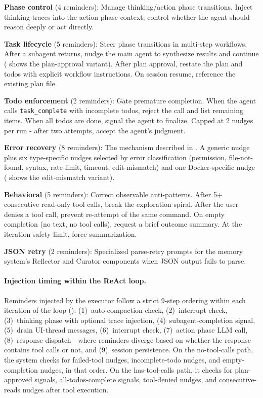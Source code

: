 \begin{packeditemize}
\item \textbf{Phase control} (4 reminders): Manage thinking/action phase transitions. Inject thinking traces into the action phase context; control whether the agent should reason deeply or act directly.

\item \textbf{Task lifecycle} (5 reminders): Steer phase transitions in multi-step workflows. After a subagent returns, nudge the main agent to synthesize results and continue ( shows the plan-approval variant). After plan approval, restate the plan and todos with explicit workflow instructions. On session resume, reference the existing plan file.

\item \textbf{Todo enforcement} (2 reminders): Gate premature completion. When the agent calls \texttt{task\_complete} with incomplete todos, reject the call and list remaining items. When all todos are done, signal the agent to finalize. Capped at 2 nudges per run - after two attempts, accept the agent's judgment.

\item \textbf{Error recovery} (8 reminders): The mechanism described in . A generic nudge plus six type-specific nudges selected by error classification (permission, file-not-found, syntax, rate-limit, timeout, edit-mismatch) and one Docker-specific nudge ( shows the edit-mismatch variant).

\item \textbf{Behavioral} (5 reminders): Correct observable anti-patterns. After 5+ consecutive read-only tool calls, break the exploration spiral. After the user denies a tool call, prevent re-attempt of the same command. On empty completion (no text, no tool calls), request a brief outcome summary. At the iteration safety limit, force summarization.

\item \textbf{JSON retry} (2 reminders): Specialized parse-retry prompts for the memory system's Reflector and Curator components when JSON output fails to parse.
\end{packeditemize}

\paragraph{Injection timing within the ReAct loop.} Reminders injected by the executor follow a strict 9-step ordering within each iteration of the loop (): (1)~auto-compaction check, (2)~interrupt check, (3)~thinking phase with optional trace injection, (4)~subagent-completion signal, (5)~drain UI-thread messages, (6)~interrupt check, (7)~action phase LLM call, (8)~response dispatch - where reminders diverge based on whether the response contains tool calls or not, and (9)~session persistence. On the no-tool-calls path, the system checks for failed-tool nudges, incomplete-todo nudges, and empty-completion nudges, in that order. On the has-tool-calls path, it checks for plan-approved signals, all-todos-complete signals, tool-denied nudges, and consecutive-reads nudges after tool execution.

